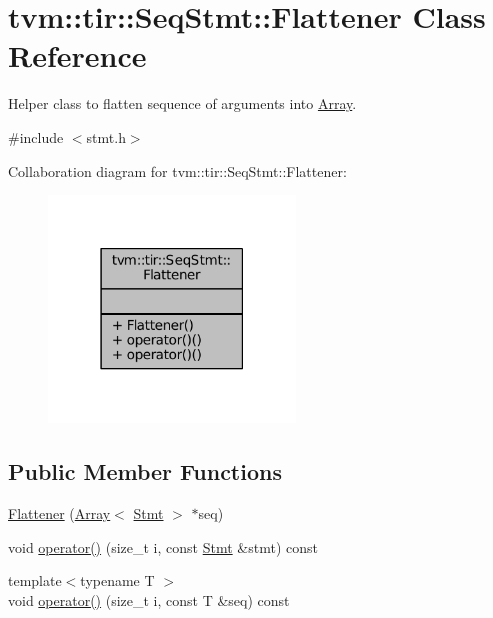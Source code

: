 \hypertarget{classtvm_1_1tir_1_1SeqStmt_1_1Flattener}{}\section{tvm\+:\+:tir\+:\+:Seq\+Stmt\+:\+:Flattener Class Reference}
\label{classtvm_1_1tir_1_1SeqStmt_1_1Flattener}


Helper class to flatten sequence of arguments into \hyperlink{classtvm_1_1Array}{Array}.  




{\ttfamily \#include $<$stmt.\+h$>$}



Collaboration diagram for tvm\+:\+:tir\+:\+:Seq\+Stmt\+:\+:Flattener\+:
\nopagebreak
\begin{figure}[H]
\begin{center}
\leavevmode
\includegraphics[width=186pt]{classtvm_1_1tir_1_1SeqStmt_1_1Flattener__coll__graph}
\end{center}
\end{figure}
\subsection*{Public Member Functions}
\begin{DoxyCompactItemize}
\item 
\hyperlink{classtvm_1_1tir_1_1SeqStmt_1_1Flattener_a0486472a502952e60fee47e4be1a0b7b}{Flattener} (\hyperlink{classtvm_1_1Array}{Array}$<$ \hyperlink{classtvm_1_1tir_1_1Stmt}{Stmt} $>$ $\ast$seq)
\item 
void \hyperlink{classtvm_1_1tir_1_1SeqStmt_1_1Flattener_a733107d11318f8074b4ba4f1c52c4fa0}{operator()} (size\+\_\+t i, const \hyperlink{classtvm_1_1tir_1_1Stmt}{Stmt} \&stmt) const 
\item 
{\footnotesize template$<$typename T $>$ }\\void \hyperlink{classtvm_1_1tir_1_1SeqStmt_1_1Flattener_a07acbb472c00595c3d6406ff2fd90434}{operator()} (size\+\_\+t i, const T \&seq) const 
\end{DoxyCompactItemize}


